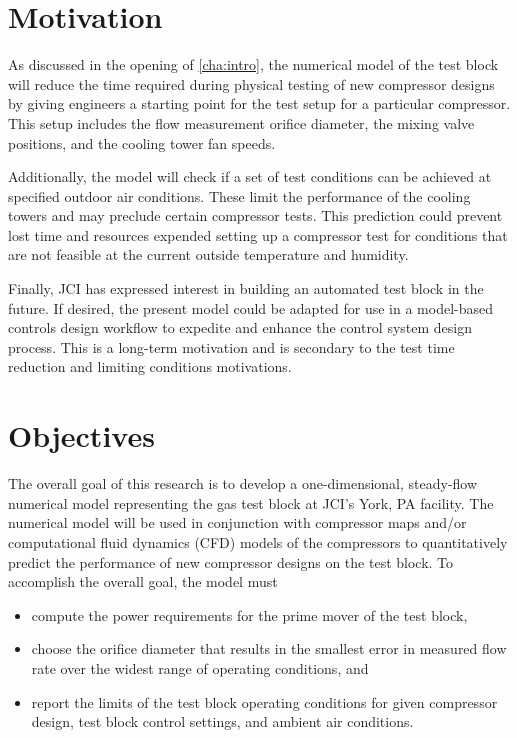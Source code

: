 \section{Motivation} \label{sec:motivation}
As discussed in the opening of \cref{cha:intro}, 
the numerical model of the test block will reduce the time required during physical testing of new compressor designs 
by giving engineers a starting point for the test setup for a particular compressor. 
This setup includes the flow measurement orifice diameter, the mixing valve positions, and the cooling tower fan speeds.

Additionally, the model will check if a set of test conditions 
can be achieved at specified outdoor air conditions. 
These limit the performance of the cooling towers and may preclude certain compressor tests. 
This prediction could prevent lost time and resources expended setting up a compressor test 
for conditions that are not feasible at the current outside temperature and humidity.

Finally, JCI has expressed interest in building an automated test block in the future. 
If desired, the present model could be adapted for use in a model-based controls design workflow 
to expedite and enhance the control system design process. 
This is a long-term motivation and is secondary to the test time reduction and limiting conditions motivations.

\section{Objectives} \label{sec:objective}
The overall goal of this research is to develop a one-dimensional, steady-flow numerical model 
representing the  gas test block at JCI's York, PA facility. 
The numerical model will be used in conjunction with compressor maps and/or computational fluid dynamics (CFD)%
models of the compressors to quantitatively predict the performance of new compressor designs on the test block. 
To accomplish the overall goal, the model must
\begin{itemize}
  \item compute the power requirements for the prime mover of the test block,
  \item choose the orifice diameter that results in the smallest error in measured
    flow rate over the widest range of operating conditions, and 
  \item report the limits of the test block operating conditions for given compressor 
		design, test block control settings, and ambient air conditions.
\end{itemize}


